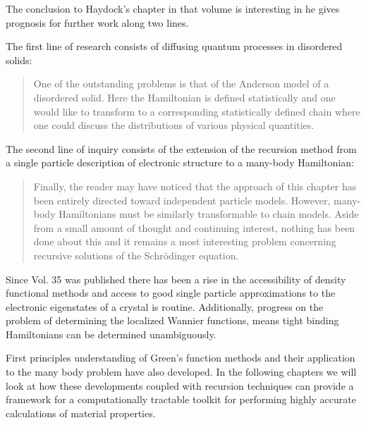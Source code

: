 The conclusion to Haydock's chapter in that volume is interesting in he gives 
prognosis for further work along two lines. 

The first line of research consists of diffusing quantum processes in disordered
solids:
%
\begin{quote}
One of the outstanding problems is that of the Anderson model
of a disordered solid. Here the Hamiltonian is defined statistically and
one would like to transform to a corresponding statistically defined chain where
one could discuss the distributions of various physical quantities.
\end{quote}
%

The second line of inquiry consists of the extension of the recursion method
from a single particle description of electronic structure to a many-body Hamiltonian:
%
\begin{quote}
Finally, the reader may have noticed that the approach of this chapter has been entirely directed
toward independent particle models. However, many-body Hamiltonians must be similarly 
transformable to chain models. Aside from a small amount of thought and continuing interest, 
nothing has been done about this and it remains a most interesting problem concerning recursive 
solutions of the Schr\"odinger equation.
\end{quote}

Since Vol. 35 was published there has been a rise in the accessibility of density functional methods 
and access to good single particle approximations to the electronic eigenstates of a crystal
is routine. Additionally, progress on the problem of determining the localized Wannier functions, 
means tight binding Hamiltonians can be determined unambiguously.

First principles understanding of Green's function methods and their application to the many body
problem have also developed. In the following chapters we will look at how these developments
coupled with recursion techniques can provide a framework for a computationally tractable 
toolkit for performing highly accurate calculations of material properties.


